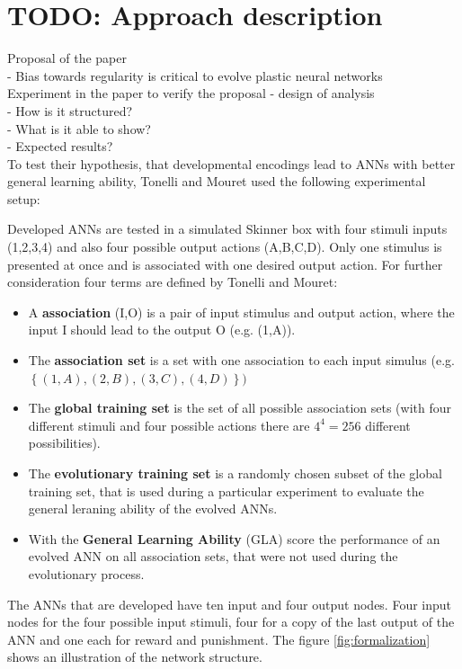 \documentclass[12pt,twoside]{article}
\theoremstyle{plain}
\theoremstyle{definition}
\theoremstyle{remark}
\begin{document}
\section{TODO: Approach description}
\label{sec:model}
Proposal of the paper\\
- Bias towards regularity is critical to evolve plastic neural networks\\
Experiment in the paper to verify the proposal - design of analysis\\
- How is it structured?\\
- What is it able to show?\\
- Expected results?\\

To test their hypothesis, that developmental encodings lead to ANNs with better general learning ability, Tonelli and Mouret used the following experimental setup:\medskip

Developed ANNs are tested in a simulated Skinner box with four stimuli inputs (1,2,3,4) and also four possible output actions (A,B,C,D). Only one stimulus is presented at once and is associated with one desired output action.
For further consideration four terms are defined by Tonelli and Mouret:
\begin{itemize}
	\item A \textbf{association} (I,O) is a pair of input stimulus and output action, where the input I should lead to the output O (e.g. (1,A)).
	\item The \textbf{association set} is a set with one association to each input simulus (e.g. $\left\{(1,A),(2,B),(3,C),(4,D)\right\})$
	\item The \textbf{global training set} is the set of all possible association sets (with four different stimuli and four possible actions there are $4^4 = 256$ different possibilities).
	\item The \textbf{evolutionary training set} is a randomly chosen subset of the global training set, that is used during a particular experiment to evaluate the general leraning ability of the evolved ANNs.
	\item With the \textbf{General Learning Ability} (GLA) score the performance of an evolved ANN on all association sets, that were not used during the evolutionary process.
\end{itemize}

The ANNs that are developed have ten input and four output nodes. Four input nodes for the four possible input stimuli, four for a copy of the last output of the ANN and one each for reward and punishment.
The figure \ref{fig:formalization} shows an illustration of the network structure.
\end{document}
